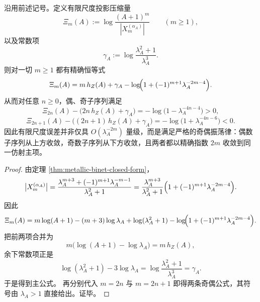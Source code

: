 \begin{theorem}[金属平均族投影压缩率的有限尺度奇偶振荡公式]\label{thm:metallic-finite-scale-compression-oscillation}
沿用前述记号。定义有限尺度投影压缩量
\[
\Xi_m(A):=\log\frac{(A+1)^m}{|X_m^{(\alpha_A)}|}
\qquad (m\ge 1),
\]
以及常数项
\[
\gamma_A:=\log\frac{\lambda_A^2+1}{\lambda_A^3}.
\]
则对一切 \(m\ge 1\) 都有精确恒等式
\[
\Xi_m(A)
=
m\,h_Z(A)+\gamma_A-\log\!\Bigl(1+(-1)^{m+1}\lambda_A^{-2m-4}\Bigr).
\]
从而对任意 \(n\ge 0\)，偶、奇子序列满足
\[
\Xi_{2n}(A)-\bigl(2n\,h_Z(A)+\gamma_A\bigr)
=
-\log\!\bigl(1-\lambda_A^{-4n-4}\bigr)>0,
\]
\[
\Xi_{2n+1}(A)-\bigl((2n+1)\,h_Z(A)+\gamma_A\bigr)
=
-\log\!\bigl(1+\lambda_A^{-4n-6}\bigr)<0.
\]
因此有限尺度误差并非仅具 \(O(\lambda_A^{-2m})\) 量级，而是满足严格的奇偶振荡律：偶数子序列从上方收敛，奇数子序列从下方收敛，且两者都以精确指数 \(2m\) 收敛到同一仿射主项。
\end{theorem}
\begin{proof}
由定理 \ref{thm:metallic-binet-closed-form}，
\[
\bigl|X_m^{(\alpha_A)}\bigr|
=
\frac{\lambda_A^{m+3}+(-1)^{m+1}\lambda_A^{-m-1}}{\lambda_A^2+1}
=
\frac{\lambda_A^{m+3}}{\lambda_A^2+1}
\Bigl(1+(-1)^{m+1}\lambda_A^{-2m-4}\Bigr).
\]
因此
\[
\Xi_m(A)
=
m\log(A+1)
-(m+3)\log\lambda_A
+\log(\lambda_A^2+1)
-\log\!\Bigl(1+(-1)^{m+1}\lambda_A^{-2m-4}\Bigr).
\]
把前两项合并为
\[
m\bigl(\log(A+1)-\log\lambda_A\bigr)=m\,h_Z(A),
\]
余下常数项正是
\[
\log(\lambda_A^2+1)-3\log\lambda_A
=
\log\frac{\lambda_A^2+1}{\lambda_A^3}
=
\gamma_A.
\]
于是得到主公式。
再分别代入 \(m=2n\) 与 \(m=2n+1\) 即得两条奇偶公式，其符号由 \(\lambda_A>1\) 直接给出。证毕。
\end{proof}

